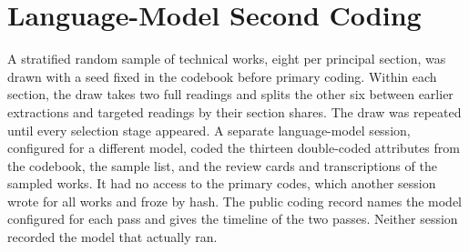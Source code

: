 \documentclass[journal]{IEEEtran}
\begin{document}




\section{Language-Model Second Coding}
\label{supp:second-coding}

A stratified random sample of \SampleCount{} technical works, eight per principal section, was drawn with a seed fixed in the codebook before primary coding. Within each section, the draw takes two full readings and splits the other six between earlier extractions and targeted readings by their section shares. The draw was repeated until every selection stage appeared. A separate language-model session, configured for a different model, coded the thirteen double-coded attributes from the codebook, the sample list, and the review cards and transcriptions of the sampled works. It had no access to the primary codes, which another session wrote for all \CorpusCount{} works and froze by hash. The public coding record names the model configured for each pass and gives the timeline of the two passes. Neither session recorded the model that actually ran.
\end{document}
